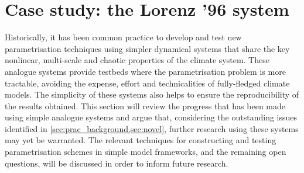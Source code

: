 \documentclass[../main.tex]{subfiles}
\begin{document}
\ifSubfilesClassLoaded{
    \frontmatter
    \tableofcontents
    \mainmatter
}{}

\chapter{Case study: the Lorenz '96 system} \label{chap:lorenz96}
\setlength{\epigraphwidth}{.45\textwidth}

Historically, it has been common practice to develop and test new
parametrisation techniques using simpler dynamical systems that share the key
nonlinear, multi-scale and chaotic properties of the climate system. These
analogue systems provide testbeds where the parametrisation problem is more
tractable, avoiding the expense, effort and technicalities of fully-fledged
climate models. The simplicity of these systems also helps to ensure the
reproducibility of the results obtained. This section will review the progress
that has been made using simple analogue systems and argue that, considering
the outstanding issues identified in
\cref{sec:prac_background,sec:novel}, further research using these
systems may yet be warranted. The relevant techniques for constructing and
testing parametrisation schemes in simple model frameworks, and the remaining
open questions, will be discussed in order to inform future research.

\end{document}
